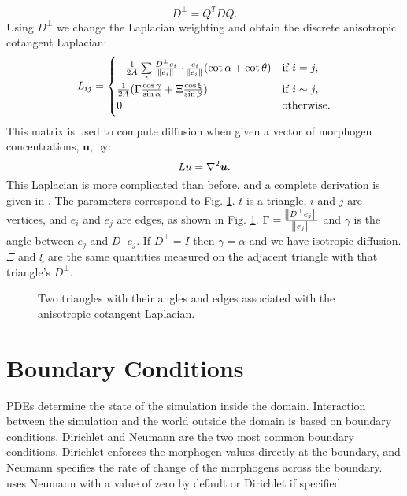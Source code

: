 \begin{equation} 
	D^\perp = Q^T D Q.
\label{eq:perpTensor}
\end{equation}
Using $D^\perp$ we change the Laplacian weighting and obtain the discrete anisotropic cotangent Laplacian:
\begin{equation} 
   L_{ij} =
   \begin{cases} 
      -\frac{1}{2A}\sum\limits_{t} \frac{D^\perp e_i}{\norm{e_i}} \cdot \frac{e_i}{\norm{e_i}}(\cot{\alpha}+\cot{\theta})  & \text{if } i = j, \\
      \frac{1}{2A}(\Gamma \frac{\cos{\gamma}}{\sin{\alpha}} + \Xi\frac{\cos{\xi}}{\sin{\beta}})                                     & \text{if } i \sim j, \\
      0 & \text{otherwise.}
   \end{cases}
   \label{eq:anisoLaplacian}
\end{equation}
This matrix is used to compute diffusion when given a vector of morphogen concentrations, $\bm{u}$, by:
\begin{equation}
	Lu = \nabla^2 \bm{u}.
\end{equation}
This Laplacian is more complicated than before, and a complete derivation is given in \citep{mathieu2014}. The parameters correspond to Fig. \ref{fig:meshLaplacian}. $t$ is a triangle, $i$ and $j$ are vertices, and $e_i$ and $e_j$ are edges, as shown in Fig. \ref{fig:meshLaplacian}. $\Gamma = \frac{\norm{D^\perp e_j}}{\norm{e_j}}$ and $\gamma$ is the angle between $e_j$ and $D^\perp e_j$. If $D^{\perp} = I$ then $\gamma = \alpha$ and we have isotropic diffusion. $\Xi$ and $\xi$ are the same quantities measured on the adjacent triangle with that triangle's $D^\perp$. %

\begin{figure}[H]
	\centering
	\caption{Two triangles with their angles and edges associated with the anisotropic cotangent Laplacian.}
	\label{fig:meshLaplacian}
\end{figure}

\section{Boundary Conditions}
PDEs determine the state of the simulation inside the domain. Interaction between the simulation and the world outside the domain is based on boundary conditions. Dirichlet and Neumann are the two most common boundary conditions. Dirichlet enforces the morphogen values directly at the boundary, and Neumann specifies the rate of change of the morphogens across the boundary. \ProgramName{} uses Neumann with a value of zero by default or Dirichlet if specified.

